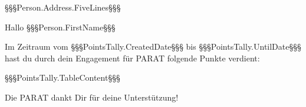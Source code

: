 ﻿\documentclass[paratletter,fontsize=11pt,foldmarks=false]{scrlttr2}
\begin{document}


\begin{letter}{%
    §§§Person.Address.FiveLines§§§
}

\enlargethispage{10cm}

\opening{Hallo §§§Person.FirstName§§§}

Im Zeitraum vom §§§PointsTally.CreatedDate§§§ bis §§§PointsTally.UntilDate§§§ hast du durch dein Engagement für PARAT folgende Punkte verdient:

\vspace{0.2cm}

§§§PointsTally.TableContent§§§

\vspace{0.2cm}

Die PARAT dankt Dir für deine Unterstützung!

\end{letter}%
\end{document}
